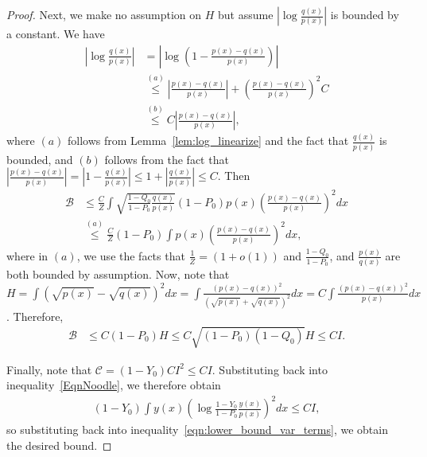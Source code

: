 \documentclass{article}
\begin{document}
\begin{proof}
Next, we make no assumption on $H$ but assume $\left| \log \frac{q(x)}{p(x)} \right|$ is bounded by a constant. We have
\begin{align*}
\left| \log \frac{q(x)}{p(x)} \right| &= \left| \log \left( 1 - \frac{p(x) - q(x)}{p(x)} \right) \right| \\
    &\stackrel{(a)} \leq \left| \frac{p(x) - q(x)}{p(x)} \right| + \left( \frac{p(x) - q(x)}{p(x)} \right)^2 C \\
  &\stackrel{(b)} \leq C \left| \frac{p(x) - q(x)}{p(x)} \right|,
\end{align*}
where $(a)$ follows from Lemma~\ref{lem:log_linearize} and the fact that $\frac{q(x)}{p(x)}$ is bounded, and $(b)$ follows from the fact that $\left| \frac{p(x) - q(x)}{p(x)} \right| = \left| 1 - \frac{q(x)}{p(x)} \right| \leq 1 + \left| \frac{q(x)}{p(x)} \right| \leq C$. Then
\begin{align*}
\mathcal{B} & \le 
         \frac{C}{Z} \int \sqrt{ \frac{1 - Q_0}{1 - P_0} \frac{q(x)}{p(x)} } (1 - P_0) p(x) 
                 \left( \frac{p(x) - q(x)}{p(x)} \right)^2 dx  \\
   &\stackrel{(a)} \leq \frac{C}{Z} (1 - P_0) \int p(x) \left( \frac{p(x) - q(x)}{p(x)} \right)^2 dx,
\end{align*}
where in $(a)$, we use the facts that $\frac{1}{Z} = (1 + o(1))$ and $\frac{1- Q_0}{1-P_0}$, and $\frac{p(x)}{q(x)}$ are both bounded by assumption. 
Now, note that $H = \int (\sqrt{p(x)} - \sqrt{q(x)})^2 dx 
= \int \frac{ (p(x) - q(x))^2 }{(\sqrt{p(x)} + \sqrt{q(x)})^2 } dx = C \int \frac{(p(x) - q(x))^2}{p(x)} dx $. Therefore,
\begin{align*}
\mathcal{B} &\leq C ( 1 - P_0) H \leq C \sqrt{ (1 - P_0)(1 - Q_0)} H \leq C I.
\end{align*}

Finally, note that $\mathcal{C} = (1 - Y_0) C I^2 \leq C I$. Substituting back into inequality~\eqref{EqnNoodle}, we therefore obtain
\begin{align*}
(1 - Y_0) \int y(x) \left( \log \frac{1 - Y_0}{1 - P_0} \frac{y(x)}{p(x)} \right)^2 dx \leq C I,
\end{align*}
so substituting back into inequality~\eqref{eqn:lower_bound_var_terms}, we obtain the desired bound.
\end{proof}
\end{document}
